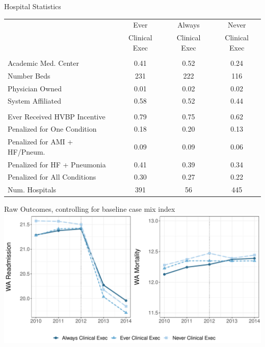 \documentclass[notes,11pt, aspectratio=169]{beamer}
\begin{document}
\begin{frame}{Hospital Statistics}
\vspace{-2mm}
    \begin{table}[ht!]
    \centering
    \begin{tabular}[t]{lccc}
     & Ever & Always & Never\\
      & Clinical Exec & Clinical Exec & Clinical Exec\\
    \midrule
    \addlinespace[0.3em]
    \multicolumn{4}{l}{\textbf{Hospital Characteristics}}\\
    \hspace{1em}Academic Med. Center & 0.41 & 0.52 & 0.24\\
    \hspace{1em}Number Beds & 231 & 222 & 116\\
    \hspace{1em}Physician Owned & 0.01 & 0.02 & 0.02\\
    \hspace{1em}System Affiliated & 0.58 & 0.52 & 0.44\\
    \addlinespace[0.3em]
    \multicolumn{4}{l}{\textbf{Penalty/Payment Variables}}\\
    \hspace{1em}Ever Received HVBP Incentive & 0.79 & 0.75 & 0.62\\
    \hspace{1em}Penalized for One Condition & 0.18 & 0.20 & 0.13\\
    \hspace{1em}Penalized for AMI + HF/Pneum. & 0.09 & 0.09 & 0.06\\
    \hspace{1em}Penalized for HF + Pneumonia & 0.41 & 0.39 & 0.34\\
    \hspace{1em}Penalized for All Conditions & 0.30 & 0.27 & 0.22\\
    Num. Hospitals & 391 & 56 & 445\\
    \bottomrule
    \end{tabular}
    \end{table}
\end{frame}

\begin{frame}{Raw Outcomes, controlling for baseline case mix index}
\centering
    \includegraphics[width=.9\textwidth]{Objects/outcomes_graph_presentation.pdf}
\end{frame}
\end{document}

